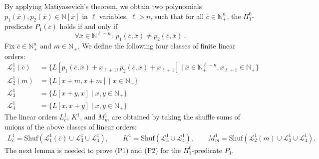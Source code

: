 \documentclass[envcountsame]{llncs}
\renewcommand{\L}{\mathcal L}
\newcommand{\N}{\mathbb N}
\renewcommand{\L}{\mathcal L}
\newcommand{\Shuf}{\mathrm{Shuf}}
\begin{document}
By applying Matiyasevich's theorem, we obtain two polynomials 
$p_1(\overline{x}), p_2(\overline{x})\in \N[\overline{x}]$ in $\ell$ variables, 
$\ell>n$, such that for all $\overline{c}\in \N_+^{n}$, the $\Pi^0_1$-predicate $P_1(\overline{c})$ holds if and only if
\[
\forall \overline{x}\in \N^{\ell-n}: \ p_1(\overline{c},\overline{x}) \neq p_2(\overline{c},\overline{x})\ .
\]
Fix $\overline{c}\in \N^n_+$ and $m\in \N_+$. We define the following four classes of finite linear orders:
\begin{align}
    \L^1_1(\overline{c}) &= \{L[p_1(\overline{c}, \overline{x})+x_{\ell+1}, 
   p_2(\overline{c},\overline{x})+x_{\ell+1}]\mid \overline{x}\in
   \N^{\ell-n}_+, x_{\ell+1}\in \N_+\} \label{class-L_1}\\
    \L^1_2(m) &= \{L[x+m,x+m]\mid x\in \N_+\} \label{class-L_2} \\
    \L^1_3 &= \{L[x+y,x]\mid x,y\in \N_+\} \label{class-L_3}\\
    \L^1_4 &= \{L[x,x+y]\mid x,y\in \N_+\} \label{class-L_4}
\end{align}
The linear orders $L^1_{\overline{c}}$, $K^1$, and $M^1_m$ are 
obtained by taking the shuffle sums of unions of the above classes of linear orders:
\begin{align*}
    L^1_{\overline{c}} = \Shuf (\L^1_1(\overline{c}) \cup \L^1_3 \cup \L^1_4), \qquad
    K^1 = \Shuf (\L^1_3 \cup \L^1_4), \qquad M^1_m = \Shuf (\L^1_2(m) \cup \L^1_3 \cup \L^1_4).
\end{align*}
The next lemma is needed to prove (P1) and (P2) for the
$\Pi^0_1$-predicate $P_1$.
\end{document}
